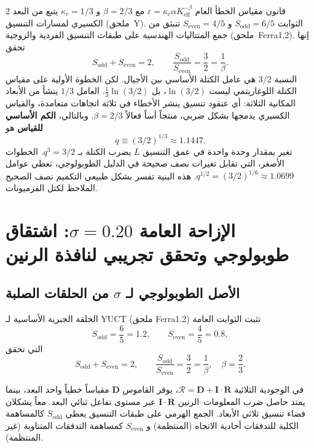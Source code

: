 \documentclass[11pt,a4paper]{article}
\newcommand{\Sodd}{S_{\mathrm{odd}}}
\newcommand{\Seven}{S_{\mathrm{even}}}
\begin{document}
\begin{multicols}{2}
		قانون مقياس الخطأ العام \(\varepsilon = \kappa_c \alpha K_{\mathrm{eff}}^{-\beta}\) مع \(\beta = 2/3\) و \(\kappa_c = 1/3\) يتبع من البعد الكسيري لمسارات التنسيق (ملحق~Y). الثوابت \(\Sodd = 6/5\) و \(\Seven = 4/5\) تنبثق من جمع المتتاليات الهندسية على طبقات التنسيق الفردية والزوجية (ملحق~Ferra1.2). إنها تحقق
		\[
		\Sodd + \Seven = 2, \qquad \frac{\Sodd}{\Seven} = \frac{3}{2} = \frac{1}{\beta}.
		\]
		النسبة \(3/2\) هي عامل الكتلة الأساسي بين الأجيال. لكن الخطوة الأولية على مقياس الكتلة اللوغاريتمي ليست \(\ln(3/2)\)، بل \(\frac{1}{3}\ln(3/2)\). العامل \(1/3\) ينشأ من الأبعاد المكانية الثلاثة: أي عنقود تنسيق ينشر الأخطاء في ثلاثة اتجاهات متعامدة، والقياس الكسيري يدمجها بشكل ضربي، منتجاً أساً فعالاً \(\beta = 2/3\). وبالتالي، \textbf{الكم الأساسي للقياس} هو
		\begin{equation}
			q \equiv (3/2)^{1/3} \approx 1.1447.
		\end{equation}
		تغير بمقدار وحدة واحدة في عمق التنسيق \(L\) يضرب الكتلة بـ \(q^3 = 3/2\). الخطوات الأصغر، التي تقابل تغيرات نصف صحيحة في الدليل الطوبولوجي، تعطي عوامل \(q^{1/2} = (3/2)^{1/6} \approx 1.0699\). هذه البنية تفسر بشكل طبيعي التكميم نصف الصحيح الملاحظ لكتل الفرميونات.
		
		\section{الإزاحة العامة \(\sigma = 0.20\): اشتقاق طوبولوجي وتحقق تجريبي لنافذة الرنين}
		\label{sec:sigma}
		
		\subsection{الأصل الطوبولوجي لـ \(\sigma\) من الحلقات الصلبة}
		
		الحلقة الجبرية الأساسية لـ YUCT (ملحق Ferra1.2) تثبت الثوابت العامة
		\[
		S_{\mathrm{odd}} = \frac{6}{5} = 1.2,\qquad S_{\mathrm{even}} = \frac{4}{5} = 0.8,
		\]
		التي تحقق
		\[
		S_{\mathrm{odd}} + S_{\mathrm{even}} = 2,\qquad \frac{S_{\mathrm{odd}}}{S_{\mathrm{even}}} = \frac{3}{2} = \frac{1}{\beta},\quad \beta = \frac{2}{3}.
		\]
		
		في الوجودية الثلاثية \( \mathcal{R} = \mathbf{D} + \mathbf{I}\!\cdot\!\mathbf{R} \)، يوفر القاموس \(\mathbf{D}\) مقياساً خطياً واحد البعد، بينما يمتد حاصل ضرب المعلومات–الرنين \(\mathbf{I}\!\cdot\!\mathbf{R}\) عبر مستوى تفاعل ثنائي البعد. معاً يشكلان فضاء تنسيق ثلاثي الأبعاد. الجمع الهرمي على طبقات التنسيق يعطي \(S_{\mathrm{odd}}\) كالمساهمة الكلية للتدفقات أحادية الاتجاه (المنتظمة) و \(S_{\mathrm{even}}\) كمساهمة التدفقات المتناوبة (غير المنتظمة).
		

\end{multicols}
\end{document}
